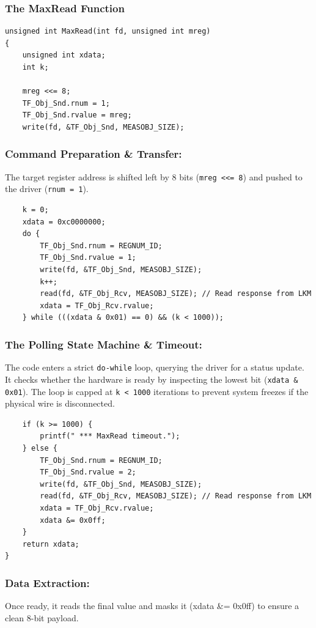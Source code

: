 \subsubsection*{The MaxRead Function}
\begin{verbatim}
unsigned int MaxRead(int fd, unsigned int mreg)
{
    unsigned int xdata;
    int k;

    mreg <<= 8;
    TF_Obj_Snd.rnum = 1;
    TF_Obj_Snd.rvalue = mreg;
    write(fd, &TF_Obj_Snd, MEASOBJ_SIZE);
\end{verbatim}

\subsubsection*{Command Preparation \& Transfer: }
The target register address is shifted left by 8 bits (\texttt{mreg <<= 8}) and pushed to the driver (\texttt{rnum = 1}).
\begin{verbatim}
    k = 0;
    xdata = 0xc0000000;
    do {
        TF_Obj_Snd.rnum = REGNUM_ID;
        TF_Obj_Snd.rvalue = 1;
        write(fd, &TF_Obj_Snd, MEASOBJ_SIZE);
        k++;
        read(fd, &TF_Obj_Rcv, MEASOBJ_SIZE); // Read response from LKM
        xdata = TF_Obj_Rcv.rvalue;
    } while (((xdata & 0x01) == 0) && (k < 1000));
\end{verbatim}

\subsubsection*{The Polling State Machine \& Timeout: }
The code enters a strict \texttt{do-while} loop, querying the driver
for a status update. It checks whether the hardware is ready by
inspecting the lowest bit (\texttt{xdata \& 0x01}). The loop is capped
at \texttt{k < 1000} iterations to prevent system freezes if the
physical wire is disconnected.

\begin{verbatim}
    if (k >= 1000) {
        printf(" *** MaxRead timeout.");
    } else {
        TF_Obj_Snd.rnum = REGNUM_ID;
        TF_Obj_Snd.rvalue = 2;
        write(fd, &TF_Obj_Snd, MEASOBJ_SIZE);
        read(fd, &TF_Obj_Rcv, MEASOBJ_SIZE); // Read response from LKM
        xdata = TF_Obj_Rcv.rvalue;
        xdata &= 0x0ff;
    }
    return xdata;
}
\end{verbatim}

\subsubsection*{Data Extraction: }
Once ready, it reads the final value and masks it (xdata \&= 0x0ff) to ensure a clean 8-bit payload.

